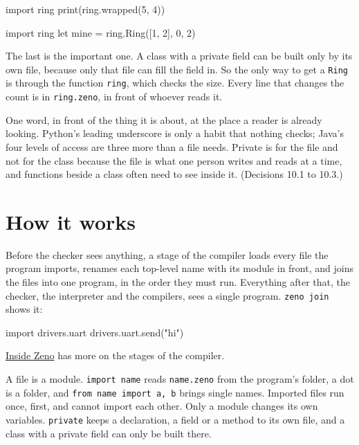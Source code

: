 \begin{zeno}[file=bad2.zeno, dir=ring, fails=yes]
import ring
print(ring.wrapped(5, 4))
\end{zeno}

\begin{zeno}[file=bad3.zeno, dir=ring, fails=yes]
import ring
let mine = ring.Ring([1, 2], 0, 2)
\end{zeno}

The last is the important one. A class with a private field can be
built only by its own file, because only that file can fill the field
in. So the only way to get a \verb|Ring| is through the function
\verb|ring|, which checks the size. Every line that changes the count
is in \verb|ring.zeno|, in front of whoever reads it.

\begin{why}
One word, in front of the thing it is about, at the place a reader is
already looking. Python's leading underscore is only a habit that
nothing checks; Java's four levels of access are three more than a
file needs. Private is for the file and not for the class because the
file is what one person writes and reads at a time, and functions
beside a class often need to see inside it. (Decisions 10.1 to 10.3.)
\end{why}

\section{How it works}

Before the checker sees anything, a stage of the compiler loads every
file the program imports, renames each top-level name with its module
in front, and joins the files into one program, in the order they
must run. Everything after that, the checker, the interpreter and the
compilers, sees a single program. \verb|zeno join| shows it:

\begin{zeno}[file=joined.zeno, dir=station, cmd=zeno join {file}]
import drivers.uart
drivers.uart.send("hi")
\end{zeno}

\hyperref[ch-inside]{Inside Zeno} has more on the stages of the
compiler.

\begin{summary}
A file is a module. \verb|import name| reads \verb|name.zeno| from the
program's folder, a dot is a folder, and \verb|from name import a, b|
brings single names. Imported files run once, first, and cannot import
each other. Only a module changes its own variables. \verb|private|
keeps a declaration, a field or a method to its own file, and a class
with a private field can only be built there.
\end{summary}

